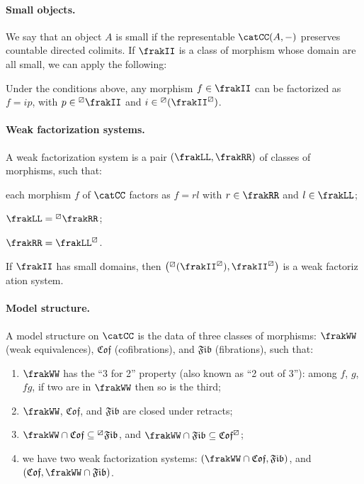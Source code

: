 \documentclass{article}
\newcommand{\Weq}{\frakWW}
\newcommand{\Fib}{\mathfrak{Fib}}
\newcommand{\Cof}{\mathfrak{Cof}}
\begin{document}
\paragraph*{Small objects. } We say that an object $A$ is small if the representable $\catCC (A, -)$ preserves countable directed colimits. If $\frakII$ is a class of morphism whose domain are all small, we can apply the following:

\begin{theorem}
Under the conditions above, any morphism $f \in \frakII$ can be factorized as $f = i p$, with $p \in {}^\boxslash \frakII$ and $i \in {}^\boxslash (\frakII^\boxslash)$.
\end{theorem}

\paragraph*{Weak factorization systems. } A weak factorization system is a pair $(\frakLL, \frakRR)$ of classes of morphisms, such that: 
\begin{inparaenum}[1.]
  \item each morphism $f$ of $\catCC$ factors as $f = rl$ with $r \in \frakRR$ and $l \in \frakLL$;
  \item $\frakLL = {}^\boxslash \frakRR$;
  \item $\frakRR = \frakLL^\boxslash$.	
\end{inparaenum}

\begin{proposition}
If $\frakII$ has small domains, then $\left( {}^\boxslash (\frakII^\boxslash), \frakII^\boxslash \right)$ is a weak factoriz	ation system.
\end{proposition}

\paragraph*{Model structure. } A model structure on $\catCC$ is the data of three classes of morphisms: $\Weq$ (weak equivalences), $\Cof$ (cofibrations), and $\Fib$ (fibrations), such that:
\begin{enumerate}
	\item $\Weq$ has the ``3 for 2'' property (also known as ``2 out of 3''): among $f$, $g$, $fg$, if two are in $\Weq$ then so is the third;
	\item $\Weq$, $\Cof$, and $\Fib$ are closed under retracts;
	\item $\Weq \cap \Cof \subseteq {}^\boxslash \Fib$, and $\Weq \cap \Fib \subseteq \Cof^\boxslash$;
	\item we have two weak factorization systems: $(\Weq \cap \Cof, \Fib)$, and $(\Cof, \Weq \cap \Fib)$.
\end{enumerate}
\end{document}
